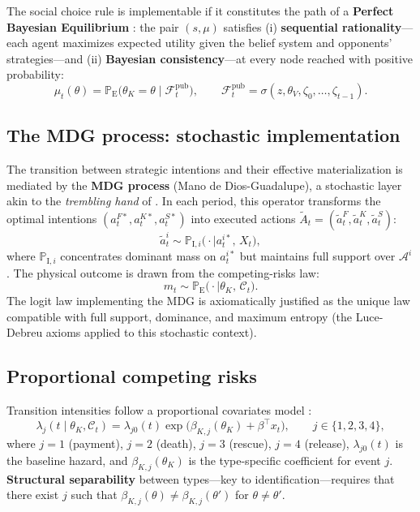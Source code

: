 \documentclass[12pt]{article}
\theoremstyle{definition}
\theoremstyle{remark}
\newcommand{\ProbE}{\mathbb{P}_{\mathrm{E}}}
\newcommand{\ProbI}[1]{\mathbb{P}_{\mathrm{I},#1}}
\newcommand{\1}{\mathbf{1}}
\begin{document}
The social choice rule is implementable if it constitutes the path of a \textbf{Perfect Bayesian Equilibrium} \parencite{FudenbergTirole1991}: the pair $(s,\mu)$ satisfies (i) \textbf{sequential rationality}---each agent maximizes expected utility given the belief system and opponents' strategies---and (ii) \textbf{Bayesian consistency}---at every node reached with positive probability:
\[
\mu_t(\theta) = \ProbE\bigl(\theta_K = \theta \mid \mathcal{F}_t^{\mathrm{pub}}\bigr),\qquad \mathcal{F}_t^{\mathrm{pub}} = \sigma(z,\theta_V,\zeta_0, \dots, \zeta_{t-1}).
\]

\subsection{The MDG process: stochastic implementation}

The transition between strategic intentions and their effective materialization is mediated by the \textbf{MDG process} (Mano de Dios-Guadalupe), a stochastic layer akin to the \emph{trembling hand} of \textcite{Selten1975Perfectness}. In each period, this operator transforms the optimal intentions $(a_t^{F\ast}, a_t^{K\ast}, a_t^{S\ast})$ into executed actions $\tilde{A}_t = (\tilde{a}_t^F, \tilde{a}_t^K, \tilde{a}_t^S)$:
\[
\tilde{a}_t^i \sim \ProbI{i}\bigl(\cdot \mid a_t^{i\ast},\, X_t\bigr),
\]
where $\ProbI{i}$ concentrates dominant mass on $a_t^{i\ast}$ but maintains full support over $\mathcal{A}^i$. The physical outcome is drawn from the competing-risks law:
\[
m_t \sim \ProbE\bigl(\cdot \mid \theta_K,\,\mathcal{C}_t\bigr).
\]
The logit law implementing the MDG is axiomatically justified as the unique law compatible with full support, dominance, and maximum entropy (the Luce-Debreu axioms applied to this stochastic context).

\subsection{Proportional competing risks}

Transition intensities follow a proportional covariates model \parencite{Cox1972}:
\[
\lambda_j(t \mid \theta_K,\mathcal{C}_t) = \lambda_{j0}(t)\exp\!\bigl(\beta_{K,j}(\theta_K) + \beta^\top x_t\bigr),\qquad j\in\{1,2,3,4\},
\]
where $j=1$ (payment), $j=2$ (death), $j=3$ (rescue), $j=4$ (release), $\lambda_{j0}(t)$ is the baseline hazard, and $\beta_{K,j}(\theta_K)$ is the type-specific coefficient for event $j$. \textbf{Structural separability} between types---key to identification---requires that there exist $j$ such that $\beta_{K,j}(\theta)\neq\beta_{K,j}(\theta')$ for $\theta\neq\theta'$.
\end{document}
